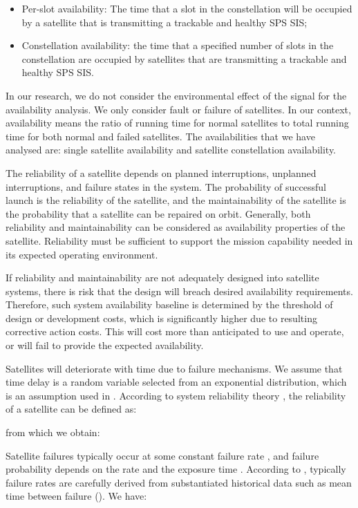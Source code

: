 \documentclass[preprint,12pt]{qrei}
\begin{document}
\begin{itemize}
\item Per-slot availability: The time that a slot in the constellation will be occupied by a satellite that is transmitting a trackable and healthy SPS SIS;
\item Constellation availability: the time that a specified number of slots in the constellation are occupied by satellites that are transmitting a trackable and healthy SPS SIS.
\end{itemize}

In our research, we do not consider the environmental effect of the signal for the availability analysis. We only consider fault or failure of satellites. In our context, availability means the ratio of running time for normal satellites to total running time for both normal and failed satellites. The availabilities that we have analysed are: single satellite availability and satellite constellation availability.

The reliability of a satellite depends on planned interruptions, unplanned interruptions, and failure states in the system. The probability of successful launch is the reliability of the satellite, and the maintainability of the satellite is the probability that a satellite can be repaired on orbit. Generally, both reliability and maintainability can be considered as availability properties of the satellite. Reliability must be sufficient to support the mission capability needed in its expected operating environment.

If reliability and maintainability are not adequately designed into satellite systems, there is risk that the design will breach desired availability requirements. Therefore, such system availability baseline is determined by the threshold of design or development costs, which is significantly higher due to resulting corrective action costs. This will cost more than anticipated to use and operate, or will fail to provide the expected availability.

Satellites will deteriorate with time due to failure mechanisms. We assume that time delay is a random variable selected from an exponential distribution, which is an assumption used in . According to system reliability theory \cite{HR09}, the reliability of a satellite  can be defined as:


\noindent from which we obtain:


Satellite failures typically occur at some constant failure rate , and failure probability depends on the rate  and the exposure time . According to \cite{Czi13}, typically failure rates are carefully derived from substantiated historical data such as mean time between failure (). We have:
\end{document}
